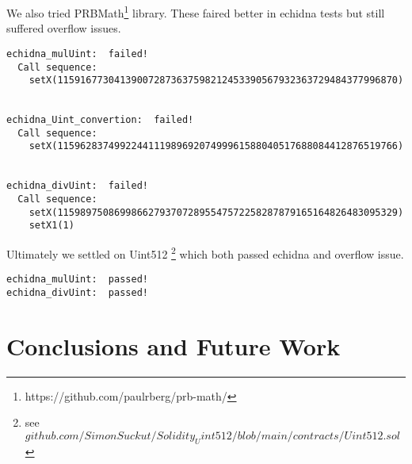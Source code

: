 \documentclass[runningheads]{llncs}
\begin{document}
We also tried PRBMath\footnote{https://github.com/paulrberg/prb-math/} library. These faired better in echidna tests but still suffered overflow issues. 

\begin{verbatim}
echidna_mulUint:  failed!
  Call sequence:
    setX(115916773041390072873637598212453390567932363729484377996870)


echidna_Uint_convertion:  failed!
  Call sequence:
    setX(115962837499224411198969207499961588040517688084412876519766)


echidna_divUint:  failed!
  Call sequence:
    setX(115989750869986627937072895547572258287879165164826483095329)
    setX1(1)
\end{verbatim}

Ultimately we settled on Uint512 \footnote{see $github.com/SimonSuckut/Solidity_Uint512/blob/main/contracts/Uint512.sol$} which both passed echidna and overflow issue.
\begin{verbatim}
echidna_mulUint:  passed! 
echidna_divUint:  passed!
\end{verbatim}



\chapter{Conclusions and Future Work}

\newpage
%
%
%
% 
% 
%
\end{document}
